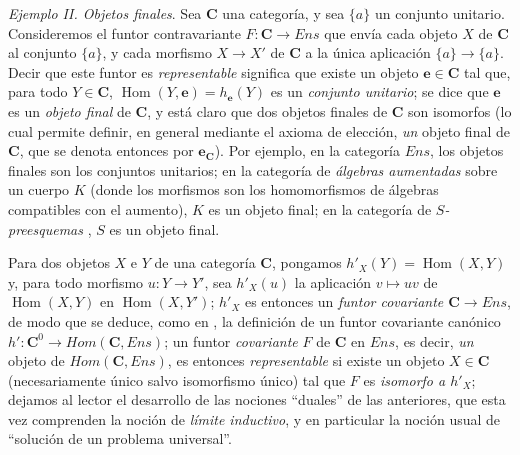\begin{env}[8.1.10]
\label{0.8.1.10}
\label{0.8.1.10-fr}
\textit{Ejemplo II. Objetos finales}.
Sea $\boldsymbol{C}$ una categoría, y sea $\{a\}$ un conjunto unitario.
Consideremos el funtor contravariante $F:\boldsymbol{C}\to\boldsymbol{\mathit{Ens}}$ que envía cada objeto $X$ de $\boldsymbol{C}$ al conjunto $\{a\}$, y cada morfismo $X\to X'$ de $\boldsymbol{C}$ a la única aplicación $\{a\}\to\{a\}$.
Decir que este funtor es \emph{representable} significa que existe un objeto $\boldsymbol{e}\in\boldsymbol{C}$ tal que, para todo $Y\in\boldsymbol{C}$, $\operatorname{Hom}(Y,\boldsymbol{e})=h_{\mathbf{e}}(Y)$ es un \emph{conjunto unitario}; se dice que $\boldsymbol{e}$ es un \emph{objeto final} de $\boldsymbol{C}$, y está claro que dos objetos finales de $\boldsymbol{C}$ son isomorfos (lo cual permite definir, en general mediante el axioma de elección, \emph{un} objeto final de $\boldsymbol{C}$, que se denota entonces por $\boldsymbol{e}_{\mathbf{C}}$).
Por ejemplo, en la categoría $\boldsymbol{\mathit{Ens}}$, los objetos finales son los conjuntos unitarios; en la categoría de \emph{álgebras aumentadas} sobre un cuerpo $K$ (donde los morfismos son los homomorfismos de álgebras compatibles con el aumento), $K$ es un objeto final; en la categoría de \emph{$S$-preesquemas} , $S$ es un objeto final.
\end{env}

\begin{env}[8.1.11]
\label{0.8.1.11}
\label{0.8.1.11-fr}
Para dos objetos $X$ e $Y$ de una categoría $\boldsymbol{C}$, pongamos $h'_X(Y)=\operatorname{Hom}(X,Y)$ y, para todo morfismo $u:Y\to Y'$, sea $h'_X(u)$ la aplicación $v\mapsto uv$ de $\operatorname{Hom}(X,Y)$ en $\operatorname{Hom}(X,Y')$; $h'_X$ es entonces un \emph{funtor covariante $\boldsymbol{C}\to\boldsymbol{\mathit{Ens}}$}, de modo que se deduce, como en , la definición de un funtor covariante canónico $h':\boldsymbol{C}^0\to\boldsymbol{\mathit{Hom}}(\boldsymbol{C},\boldsymbol{\mathit{Ens}})$; un funtor \emph{covariante} $F$ de $\boldsymbol{C}$ en $\boldsymbol{\mathit{Ens}}$, es decir, \emph{un} objeto de $\boldsymbol{\mathit{Hom}}(\boldsymbol{C},\boldsymbol{\mathit{Ens}})$, es entonces \emph{representable} si existe un objeto $X\in\boldsymbol{C}$ (necesariamente único salvo isomorfismo único) tal que $F$ es \emph{isomorfo a $h'_X$}; dejamos al lector el desarrollo de las nociones ``duales'' de las anteriores, que esta vez comprenden la noción de \emph{límite inductivo}, y en particular la noción usual de ``solución de un problema universal''.
\end{env}

